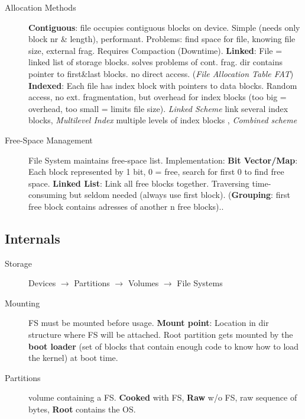 \begin{description}
    \item[Allocation Methods] \textbf{Contiguous}: file occupies contiguous blocks on device. Simple (needs only block nr \& length), performant. Problems: find space for file, knowing file size, external frag. Requires Compaction (Downtime). %
        \textbf{Linked}: File = linked list of storage blocks. solves problems of cont. frag. dir contains pointer to first\&last blocks. no direct access. (\textit{File Allocation Table FAT}) %
        \textbf{Indexed}: Each file has index block with pointers to data blocks. Random access, no ext. fragmentation, but overhead for index blocks (too big = overhead, too small = limits file size). \textit{Linked Scheme} link several index blocks, \textit{Multilevel Index} multiple levels of index blocks , \textit{Combined scheme}
    \item[Free-Space Management] File System maintains free-space list. Implementation: \textbf{Bit Vector/Map}: Each block represented by 1 bit, 0 = free, search for first 0 to find free space. \textbf{Linked List}: Link all free blocks together. Traversing time-consuming but seldom needed (always use first block). (\textbf{Grouping}: first free block contains adresses of another n free blocks)..
\end{description}
\subsection*{Internals}
\begin{description}
    \item[Storage] Devices $\rightarrow$ Partitions $\rightarrow$ Volumes $\rightarrow$ File Systems
    \item[Mounting] FS must be mounted before usage. \textbf{Mount point}: Location in dir structure where FS will be attached. Root partition gets mounted by the \textbf{boot loader} (set of blocks that contain enough code to know how to load the kernel) at boot time.
    \item[Partitions] volume containing a FS. \textbf{Cooked} with FS, \textbf{Raw} w/o FS, raw sequence of bytes, \textbf{Root} contains the OS.
\end{description}
